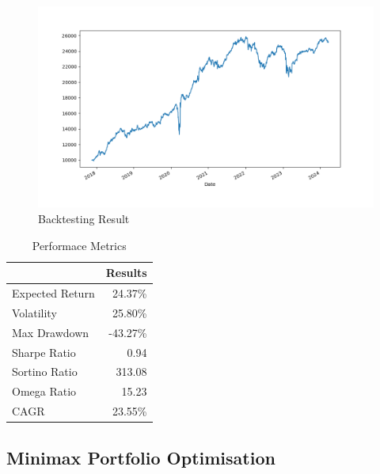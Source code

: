  \begin{figure}[H]
   \centering
   \includegraphics[width=1\linewidth]{images/MAD/backtest.png}
   \caption{Backtesting Result}
   \label{fig:network_architecture1}
 \end{figure}

 \begin{table}[H]

    \centering %
    \label{tab:performance_metrics}
    
    \caption{Performace Metrics}
    \vspace{5mm} %

\begin{tabular}{lr}
\toprule
 & Results \\
\midrule
Expected Return & 24.37\% \\
Volatility & 25.80\% \\
Max Drawdown & -43.27\% \\
Sharpe Ratio & 0.94 \\
Sortino Ratio & 313.08 \\
Omega Ratio & 15.23 \\
CAGR & 23.55\% \\
\bottomrule
\end{tabular}
\end{table}

\subsection{Minimax Portfolio Optimisation}

